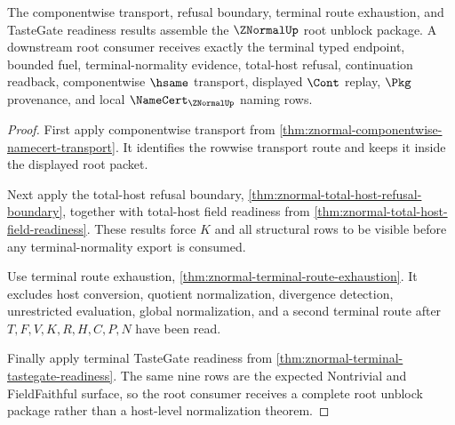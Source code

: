 \begin{theorem}
\label{thm:znormal-root-readiness-export-package}
The componentwise transport, refusal boundary, terminal route exhaustion, and TasteGate readiness results assemble the $\ZNormalUp$ root unblock package. A downstream root consumer receives exactly the terminal typed endpoint, bounded fuel, terminal-normality evidence, total-host refusal, continuation readback, componentwise $\hsame$ transport, displayed $\Cont$ replay, $\Pkg$ provenance, and local $\NameCert_{\ZNormalUp}$ naming rows.
\end{theorem}
\begin{proof}
First apply componentwise transport from \autoref{thm:znormal-componentwise-namecert-transport}. It identifies the rowwise transport route and keeps it inside the displayed root packet.

Next apply the total-host refusal boundary, \autoref{thm:znormal-total-host-refusal-boundary}, together with total-host field readiness from \autoref{thm:znormal-total-host-field-readiness}. These results force $K$ and all structural rows to be visible before any terminal-normality export is consumed.

Use terminal route exhaustion, \autoref{thm:znormal-terminal-route-exhaustion}. It excludes host conversion, quotient normalization, divergence detection, unrestricted evaluation, global normalization, and a second terminal route after $T,F,V,K,R,H,C,P,N$ have been read.

Finally apply terminal TasteGate readiness from \autoref{thm:znormal-terminal-tastegate-readiness}. The same nine rows are the expected Nontrivial and FieldFaithful surface, so the root consumer receives a complete root unblock package rather than a host-level normalization theorem.
\end{proof}
